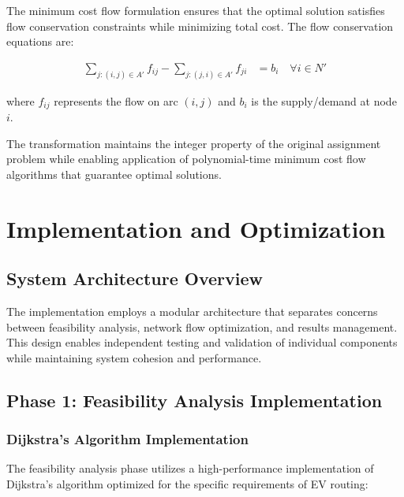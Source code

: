 \documentclass[12pt,a4paper]{article}
\begin{document}
The minimum cost flow formulation ensures that the optimal solution satisfies flow conservation constraints while minimizing total cost. The flow conservation equations are:

\begin{align}
\sum_{j:(i,j) \in A'} f_{ij} - \sum_{j:(j,i) \in A'} f_{ji} &= b_i \quad \forall i \in N'
\end{align}

where $f_{ij}$ represents the flow on arc $(i,j)$ and $b_i$ is the supply/demand at node $i$.

The transformation maintains the integer property of the original assignment problem while enabling application of polynomial-time minimum cost flow algorithms that guarantee optimal solutions.

\section{Implementation and Optimization}

\subsection{System Architecture Overview}

The implementation employs a modular architecture that separates concerns between feasibility analysis, network flow optimization, and results management. This design enables independent testing and validation of individual components while maintaining system cohesion and performance.

\subsection{Phase 1: Feasibility Analysis Implementation}

\subsubsection{Dijkstra's Algorithm Implementation}

The feasibility analysis phase utilizes a high-performance implementation of Dijkstra's algorithm optimized for the specific requirements of EV routing:
\end{document}
